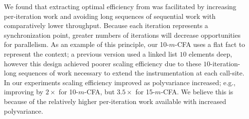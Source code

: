We found that extracting optimal efficiency
from \slog{} was facilitated by increasing per-iteration work and
avoiding long sequences of sequential work with comparatively lower
throughput. Because each iteration represents a synchronization point, greater numbers of iterations will decrease opportunities for parallelism. As an example of this principle, our 10-$m$-CFA uses a
flat  fact to represent the context; a previous version used
a linked list $10$ elements deep, however this design achieved poorer
scaling efficiency due to these $10$-iteration-long sequences of work necessary to
extend the instrumentation at each call-site.
In our experiments scaling efficiency improved as polyvariance increased; e.g., improving by $2\times$ for 10-$m$-CFA, but $3.5\times$ for 15-$m$-CFA. We believe this is because of the relatively higher per-iteration work available with increased polyvariance.



